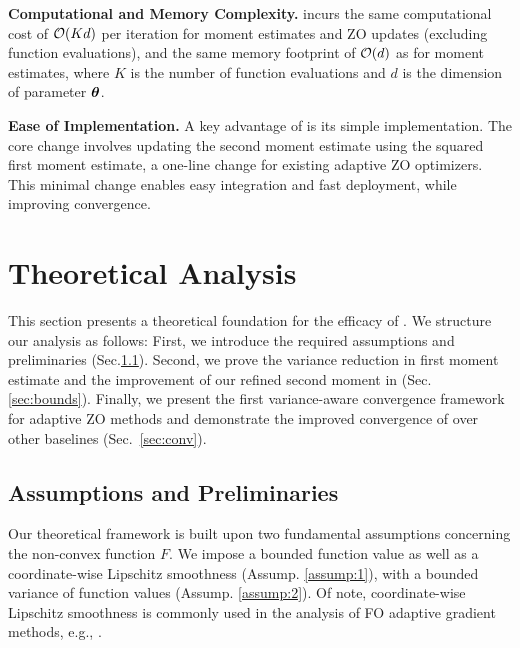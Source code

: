 \textbf{Computational and Memory Complexity.} \ours{} incurs the same computational cost of ${\mathcal{O}}(Kd)$ per iteration for moment estimates and ZO updates (excluding function evaluations), and the same memory footprint of ${\mathcal{O}}(d)$ as \base{} for moment estimates, where $K$ is the number of function evaluations and $d$ is the dimension of parameter ${\bm{\theta}}$. 

\textbf{Ease of Implementation.} A key advantage of \ours{} is its simple implementation. The core change involves updating the second moment estimate using the squared first moment estimate, a one-line change for existing adaptive ZO optimizers. This minimal change enables easy integration and fast deployment, while improving convergence.

\section{Theoretical Analysis}\label{sec:theory}

This section presents a theoretical foundation for the efficacy of \ours{}. We structure our analysis as follows: First, we introduce the required assumptions and preliminaries (Sec.\ref{sec:assumps}). Second, we prove the variance reduction in first moment estimate and the improvement of our refined second moment in \ours{} (Sec. \ref{sec:bounds}). Finally, we present the first variance-aware convergence framework for adaptive ZO methods and demonstrate the improved convergence of \ours{} over other baselines (Sec.~\ref{sec:conv}). 

\subsection{Assumptions and Preliminaries}\label{sec:assumps}
Our theoretical framework is built upon two fundamental assumptions concerning the non-convex function $F$. We impose a bounded function value as well as a coordinate-wise Lipschitz smoothness (Assump. \ref{assump:1}), with a bounded variance of function values (Assump. \ref{assump:2}). Of note, coordinate-wise Lipschitz smoothness is commonly used in the analysis of FO adaptive gradient methods, e.g., \citep{zhang2024convergence, wang2024closing}. 

